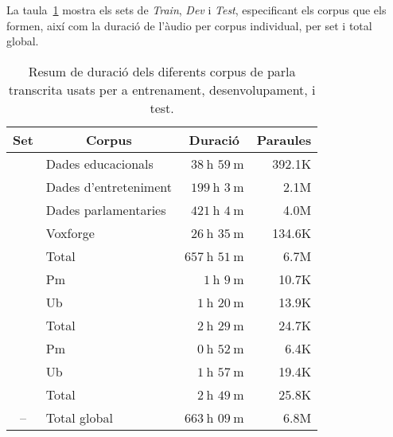 La taula~\ref{tab:resum_corpus} mostra els sets de \textit{Train}, \textit{Dev} i \textit{Test}, especificant els corpus que els formen, així com la duració de l'àudio per corpus individual, per set i total global.

\begin{table}[ht!]
    \centering
    \caption{Resum de duració dels diferents corpus de parla transcrita usats per a entrenament, desenvolupament, i test.}
    \begin{tabular}{c|l|r|r}
        \multicolumn{1}{c|}{Set} & \multicolumn{1}{c|}{Corpus} & \multicolumn{1}{c|}{Duració} & \multicolumn{1}{c}{Paraules} \\
        \hline
        \centering \multirow{5}{*}{Train}    & Dades educacionals  & $38~\mathrm{h}$ $59~\mathrm{m}$        & 392.1K  \\ 
                                             & Dades d'entreteniment   & $199~\mathrm{h}$ $3~\mathrm{m}$    & 2.1M \\ 
                                             & Dades parlamentaries   & $421~\mathrm{h}$ $4~\mathrm{m}$     & 4.0M \\ 
                                             & Voxforge  & $26~\mathrm{h}$ $35~\mathrm{m}$                  & 134.6K  \\ 
        \cline{2-4}
                                             & Total        & $657~\mathrm{h}$ $51~\mathrm{m}$              & 6.7M \\
        \hline
        \centering \multirow{3}{*}{Dev}      & Pm   & $1~\mathrm{h}$ $9~\mathrm{m}$                         & 10.7K   \\
                                             & Ub   & $1~\mathrm{h}$ $20~\mathrm{m}$                        & 13.9K   \\
        \cline{2-4}
                                             & Total        & $2~\mathrm{h}$ $29~\mathrm{m}$                & 24.7K   \\
        \hline
        \centering \multirow{3}{*}{Test}     & Pm   & $0~\mathrm{h}$ $52~\mathrm{m}$                        & 6.4K    \\
                                             & Ub   & $1~\mathrm{h}$ $57~\mathrm{m}$                        & 19.4K  \\
        \cline{2-4}
                                             & Total        & $2~\mathrm{h}$ $49~\mathrm{m}$                & 25.8K  \\
        \hline
        --                                   & Total global        & $663~\mathrm{h}$ $09~\mathrm{m}$       & 6.8M  \\ 
    \end{tabular}
    \label{tab:resum_corpus}
\end{table}


